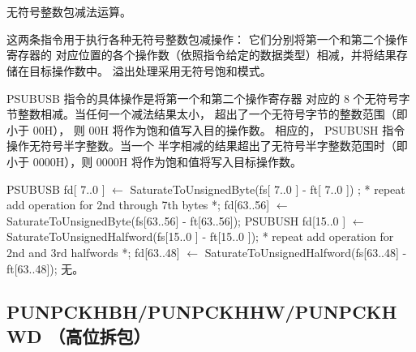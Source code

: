 \begin{instructionblk}
   \\
   \\
  {无符号整数包减法运算。}
  {这两条指令用于执行各种无符号整数包减操作： 它们分别将第一个和第二个操作寄存器的
  对应位置的各个操作数（依照指令给定的数据类型）相减，并将结果存储在目标操作数中。
  溢出处理采用无符号饱和模式。

  PSUBUSB 指令的具体操作是将第一个和第二个操作寄存器
  对应的 8 个无符号字节整数相减。当任何一个减法结果太小，
  超出了一个无符号字节的整数范围（即小于 00H），
  则 00H 将作为饱和值写入目的操作数。
  相应的， PSUBUSH 指令操作无符号半字整数。当一个
  半字相减的结果超出了无符号半字整数范围时（即小于
  0000H），则 0000H 将作为饱和值将写入目标操作数。}
  {PSUBUSB \narrownewline
  fd[ 7..0 ]  $\leftarrow$ SaturateToUnsignedByte(fs[ 7..0 ] - ft[ 7..0 ]) ; \narrownewline
  * repeat add operation for 2nd through 7th bytes *; \narrownewline
  fd[63..56] $\leftarrow$ SaturateToUnsignedByte(fs[63..56] - ft[63..56]); \narrownewline \narrownewline
  PSUBUSH \narrownewline
  fd[15..0 ] $\leftarrow$ SaturateToUnsignedHalfword(fs[15..0 ] - ft[15..0 ]); \narrownewline
  * repeat add operation for 2nd and 3rd halfwords *; \narrownewline
  fd[63..48] $\leftarrow$ SaturateToUnsignedHalfword(fs[63..48] - ft[63..48]);}
  {无。}
\end{instructionblk}

\subsection{PUNPCKHBH/PUNPCKHHW/PUNPCKHWD （高位拆包）}

